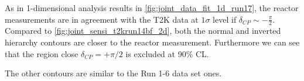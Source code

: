 As in 1-dimensional analysis results
in \cref{fig:joint_data_fit_1d_run17}, the reactor measurements are 
in agreement with the T2K data at $1\sigma$ level if $\delta_{CP} \sim - \frac{\pi}{2}$. 
Compared to \cref{fig:joint_sensi_t2krun14bf_2d}, both the normal and inverted 
hierarchy contours are closer to the reactor measurement.
Furthermore we can see that the region close $\delta_{CP} = + \pi/2$ is excluded at 90\% CL.

The other contours are similar to the Run 1-6 data set ones.


